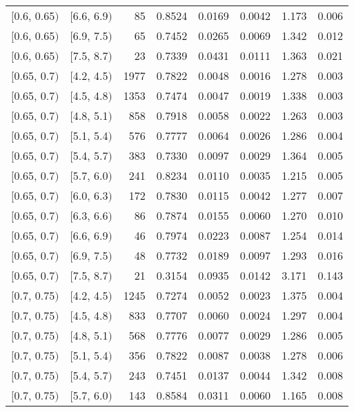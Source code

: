 \begin{longtable}{| l | l | r | r | r | r | r | r |}
        $[$0.6, 0.65$)$ & $[$6.6, 6.9$)$ & 85 & 0.8524 & 0.0169 & 0.0042 & 1.173 & 0.006 \\
        $[$0.6, 0.65$)$ & $[$6.9, 7.5$)$ & 65 & 0.7452 & 0.0265 & 0.0069 & 1.342 & 0.012 \\
        $[$0.6, 0.65$)$ & $[$7.5, 8.7$)$ & 23 & 0.7339 & 0.0431 & 0.0111 & 1.363 & 0.021 \\
        $[$0.65, 0.7$)$ & $[$4.2, 4.5$)$ & 1977 & 0.7822 & 0.0048 & 0.0016 & 1.278 & 0.003 \\
        $[$0.65, 0.7$)$ & $[$4.5, 4.8$)$ & 1353 & 0.7474 & 0.0047 & 0.0019 & 1.338 & 0.003 \\
        $[$0.65, 0.7$)$ & $[$4.8, 5.1$)$ & 858 & 0.7918 & 0.0058 & 0.0022 & 1.263 & 0.003 \\
        $[$0.65, 0.7$)$ & $[$5.1, 5.4$)$ & 576 & 0.7777 & 0.0064 & 0.0026 & 1.286 & 0.004 \\
        $[$0.65, 0.7$)$ & $[$5.4, 5.7$)$ & 383 & 0.7330 & 0.0097 & 0.0029 & 1.364 & 0.005 \\
        $[$0.65, 0.7$)$ & $[$5.7, 6.0$)$ & 241 & 0.8234 & 0.0110 & 0.0035 & 1.215 & 0.005 \\
        $[$0.65, 0.7$)$ & $[$6.0, 6.3$)$ & 172 & 0.7830 & 0.0115 & 0.0042 & 1.277 & 0.007 \\
        $[$0.65, 0.7$)$ & $[$6.3, 6.6$)$ & 86 & 0.7874 & 0.0155 & 0.0060 & 1.270 & 0.010 \\
        $[$0.65, 0.7$)$ & $[$6.6, 6.9$)$ & 46 & 0.7974 & 0.0223 & 0.0087 & 1.254 & 0.014 \\
        $[$0.65, 0.7$)$ & $[$6.9, 7.5$)$ & 48 & 0.7732 & 0.0189 & 0.0097 & 1.293 & 0.016 \\
        $[$0.65, 0.7$)$ & $[$7.5, 8.7$)$ & 21 & 0.3154 & 0.0935 & 0.0142 & 3.171 & 0.143 \\
        $[$0.7, 0.75$)$ & $[$4.2, 4.5$)$ & 1245 & 0.7274 & 0.0052 & 0.0023 & 1.375 & 0.004 \\
        $[$0.7, 0.75$)$ & $[$4.5, 4.8$)$ & 833 & 0.7707 & 0.0060 & 0.0024 & 1.297 & 0.004 \\
        $[$0.7, 0.75$)$ & $[$4.8, 5.1$)$ & 568 & 0.7776 & 0.0077 & 0.0029 & 1.286 & 0.005 \\
        $[$0.7, 0.75$)$ & $[$5.1, 5.4$)$ & 356 & 0.7822 & 0.0087 & 0.0038 & 1.278 & 0.006 \\
        $[$0.7, 0.75$)$ & $[$5.4, 5.7$)$ & 243 & 0.7451 & 0.0137 & 0.0044 & 1.342 & 0.008 \\
        $[$0.7, 0.75$)$ & $[$5.7, 6.0$)$ & 143 & 0.8584 & 0.0311 & 0.0060 & 1.165 & 0.008 \\

\end{longtable}
